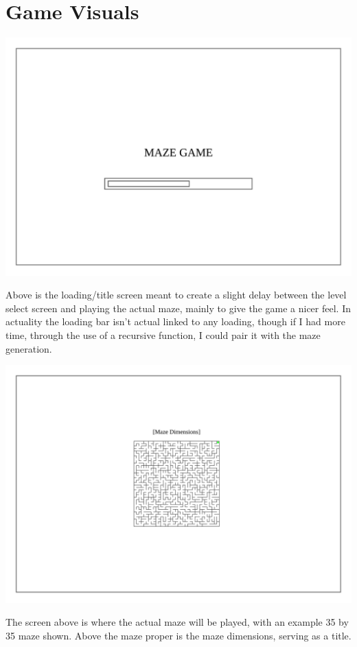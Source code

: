 \documentclass{article}
\begin{document}
\section{Game Visuals}
\begin{center}
	\includegraphics[scale=0.7]{Loading Screen}
	
	Above is the loading/title screen meant to create a slight delay between the level select screen and playing the actual maze, mainly to give the game
	a nicer feel. In actuality the loading bar isn't actual linked to any loading, though if I had more time, through the use of a recursive function, I could pair it with
	the maze generation.
\end{center}
\begin{center}
	\includegraphics[scale=0.7]{Maze Screen}

	The screen above is where the actual maze will be played, with an example 35 by 35 maze shown.  Above the maze proper is the maze dimensions,
	serving as a title.
\end{center}
\end{document}
